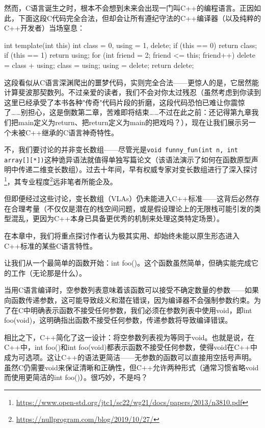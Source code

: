 然而，C语言诞生之时，根本不会想到未来会出现一门叫C++的编程语言。正因如此，下面这段C代码完全合法，但却会让所有遵纪守法的C++编译器（以及纯粹的C++开发者）当场窒息：

\begin{cpp}
int template(int this) {
  int class = 0, using = 1, delete;
  if (this == 0) return class;
  if (this == 1) return using;
  for (int friend = 2; friend <= this; friend++) {
    delete = class + using;
    class = using;
    using = delete;
  }
  return delete;
}
\end{cpp}

这段看似从C语言深渊爬出的噩梦代码，实则完全合法——更惊人的是，它居然能计算斐波那契数列。不过亲爱的读者，我们不会对你太过残忍（虽然考虑到你读到这里已经承受了本书各种"传奇"代码片段的折磨，这段代码恐怕已难让你震惊了……别担心，这是倒数第二章，苦难即将结束……不过在此之前：还记得第九章我们把main定义为return、把return定义为main的把戏吗？），现在让我们展示另一个未被C++继承的C语言神奇特性。

不，我们要讨论的并非变长数组——尽管光是\verb|void funny_fun(int n, int array[][*])|这种诡异语法就值得单独写篇论文（该语法演示了如何在函数原型声明中传递二维变长数组）。过去十年间，早有权威专家对变长数组进行了深入探讨\footnote{\url{https://www.open-std.org/jtc1/sc22/wg21/docs/papers/2013/n3810.pdf}}，其专业程度\footnote{\url{https://nullprogram.com/blog/2019/10/27/}}远非笔者所能企及。

但即便经过这些讨论，变长数组（VLAs）仍未能进入C++标准——这背后必然存在合理考量（不仅仅是潜在的栈空间问题，或是假设理论上的无限栈可能引发的类型混乱，更因为C++本身已具备更优秀的机制来处理这类特定场景）。

在本章中，我们将重点探讨作者认为极其实用、却始终未能以原生形态进入C++标准的某些C语言特性。


让我们从一个最简单的函数开始：int foo()。这个函数虽然简单，但确实能完成它的工作（无论那是什么）。

当用C语言编译时，空参数列表意味着该函数可以接受不确定数量的参数——如果向函数传递参数，这可能导致歧义和潜在错误，因为编译器不会强制参数约束。为了在C中明确表示函数不接受任何参数，我们必须在参数列表中使用void，即int foo(void)，这明确指出函数不接受任何参数，传递参数将导致编译错误。

相比之下，C++简化了这一设计：将空参数列表视为等同于void。也就是说，在C++中，int foo()和int foo(void)都表示函数不接受任何参数，使得void在C++中成为可选项。这让C++的语法更简洁——无参数的函数可以直接用空括号声明。虽然C仍需要void来保证清晰和正确性，但C++允许两种形式（通常习惯省略void而使用更简洁的int foo()）。很巧妙，不是吗？

